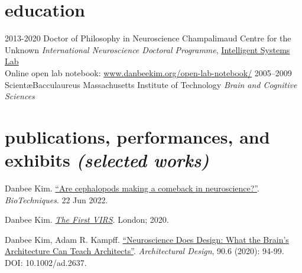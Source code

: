 \documentclass[10pt, a4]{friggeri-cv}
\begin{document}
\section{education}

\begin{entrylist}
  \entry
    {2013-2020}
    {Doctor of Philosophy in Neuroscience}
    {Champalimaud Centre for the Unknown}
    {\emph{International Neuroscience Doctoral Programme}, \href{http://neuro.fchampalimaud.org/en/research/investigators/research-groups/group/Kampff/}{Intelligent Systems Lab} 
    \\ Online open lab notebook: \href{http://www.danbeekim.org/open-lab-notebook/}{www.danbeekim.org/open-lab-notebook/}
	}
  \entry
    {2005–2009}
    {Scient\ae Bacculaureus}
    {Massachusetts Institute of Technology}
	{\emph{Brain and Cognitive Sciences}}
\end{entrylist}

\section{publications, performances, and exhibits \emph{\small (selected works)}}

Danbee Kim. \href{https://www.biotechniques.com/neuroscience/are-cephalopods-making-a-comeback-in-neuroscience/}{``Are cephalopods making a comeback in neuroscience?''}. \emph{BioTechniques}. 22 Jun 2022.



\vspace{1.2mm}
Danbee Kim. \href{http://www.danbeekim.org/VIRS}{\emph{The First VIRS}}. London; 2020. 

\vspace{1.2mm}
Danbee Kim, Adam R. Kampff. \href{https://sci-hub.do/https://onlinelibrary.wiley.com/doi/abs/10.1002/ad.2637}{``Neuroscience Does Design: What the Brain's Architecture Can Teach Architects''}. \emph{Architectural Design}, 90.6 (2020): 94-99. DOI: 10.1002/ad.2637.
\end{document}
